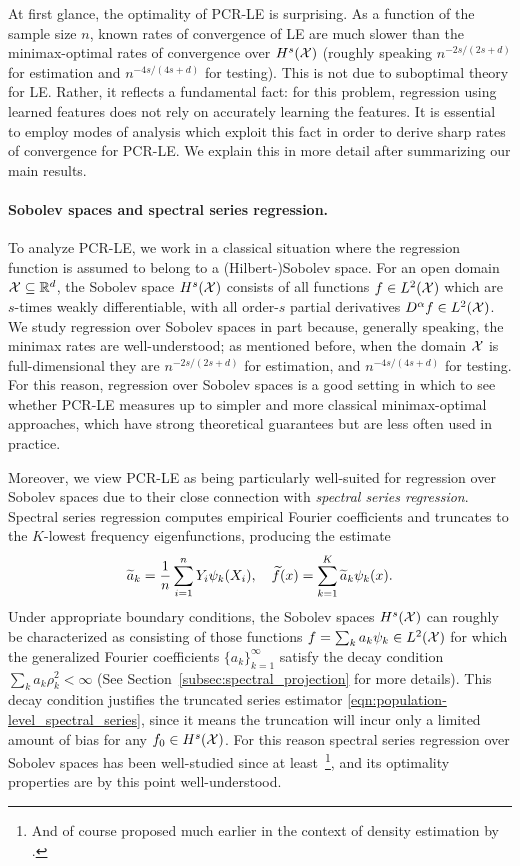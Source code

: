At first glance, the optimality of PCR-LE is surprising. As a function of the sample size $n$, known rates of convergence of LE are much slower than the minimax-optimal rates of convergence over $H^s(\mathcal{X})$ (roughly speaking $n^{-2s/(2s + d)}$ for estimation and $n^{-4s/(4s + d)}$ for testing). This is not due to suboptimal theory for LE. Rather, it reflects a fundamental fact: for this problem, regression using learned features does not rely on accurately learning the features. It is essential to employ modes of analysis which exploit this fact in order to derive sharp rates of convergence for PCR-LE. We explain this in more detail after summarizing our main results.

\paragraph{Sobolev spaces and spectral series regression.}
To analyze PCR-LE, we work in a classical situation where the regression function is assumed to belong to a (Hilbert-)Sobolev space. For an open domain $\mathcal{X} \subseteq \mathbb{R}^d$, the Sobolev space $H^s(\mathcal{X})$ consists of all functions $f \in L^2(\mathcal{X})$ which are $s$-times weakly differentiable, with all order-$s$ partial derivatives $D^{\alpha}f \in L^2(\mathcal{X})$. We study regression over Sobolev spaces in part because, generally speaking, the minimax rates are well-understood; as mentioned before, when the domain $\mathcal{X}$ is full-dimensional they are $n^{-2s/(2s + d)}$ for estimation, and $n^{-4s/(4s + d)}$ for testing. For this reason, regression over Sobolev spaces is a good setting in which to see whether PCR-LE measures up to simpler and more classical minimax-optimal approaches, which have strong theoretical guarantees but are less often used in practice.

Moreover, we view PCR-LE as being particularly well-suited for regression over Sobolev spaces due to their close connection with \emph{spectral series regression}. Spectral series regression computes empirical Fourier coefficients and truncates to the $K$-lowest frequency eigenfunctions, producing the estimate
\begin{equation}
\label{eqn:population-level_spectral_series}
\widetilde{a}_k = \frac{1}{n}\sum_{i = 1}^{n} Y_i \psi_k(X_i), \quad \widetilde{f}(x) = \sum_{k = 1}^{K} \widetilde{a}_k \psi_k(x).
\end{equation} 
Under appropriate boundary conditions, the Sobolev spaces $H^s(\mathcal{X})$ can roughly be characterized as consisting of those functions $f = \sum_{k} a_k \psi_k \in L^2(\mathcal{X})$ for which the generalized Fourier coefficients $\{a_k\}_{k = 1}^{\infty}$ satisfy the decay condition $\sum_{k} a_k \rho_k^2 < \infty$ (See Section~\ref{subsec:spectral_projection} for more details). This decay condition justifies the truncated series estimator \eqref{eqn:population-level_spectral_series}, since it means the truncation will incur only a limited amount of bias for any $f_0 \in H^s(\mathcal{X})$. For this reason spectral series regression over Sobolev spaces has been well-studied since at least~\citet{rice1984}\footnote{And of course proposed much earlier in the context of density estimation by \citet{cencov1962}.}, and its optimality properties are by this point well-understood.

